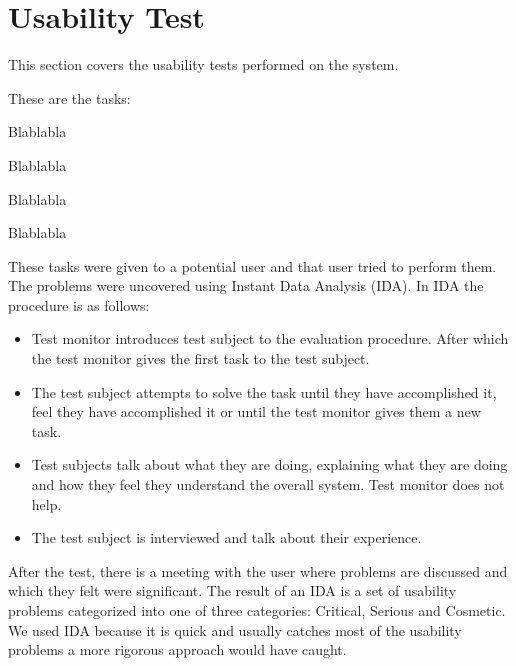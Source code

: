 \section{Usability Test}
This section covers the usability tests performed on the system.

These are the tasks:

\begin{description}[style=nextline]
\item[Task 1] Blablabla
\item[Task 2] Blablabla
\item[Task 3] Blablabla
\item[Task 4] Blablabla
\end{description}

These tasks were given to a potential user and that user tried to perform them.
The problems were uncovered using Instant Data Analysis (IDA).
In IDA the procedure is as follows:

\begin{itemize}
\item Test monitor introduces test subject to the evaluation procedure. After which the test monitor gives the first task to the test subject.
\item The test subject attempts to solve the task until they have accomplished it, feel they have accomplished it or until the test monitor gives them a new task.
\item Test subjects talk about what they are doing, explaining what they are doing and how they feel they understand the overall system. Test monitor does not help.
\item The test subject is interviewed and talk about their experience.
\end{itemize}\citep{misc:usabilitytest}

After the test, there is a meeting with the user where problems are discussed and which they felt were significant.
The result of an IDA is a set of usability problems categorized into one of three categories: Critical, Serious and Cosmetic.
We used IDA because it is quick and usually catches most of the usability problems a more rigorous approach would have caught.

